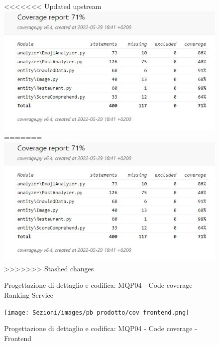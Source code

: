 \begin{figure}[H]
\centering
<<<<<<< Updated upstream
    \includegraphics[scale=0.50]{Sezioni/images/pb_prodotto/coverage-RS.JPG}
=======
    \includegraphics[scale=0.70]{Sezioni/images/pb prodotto/coverage-RS.JPG}
>>>>>>> Stashed changes
    \caption{Progettazione di dettaglio e codifica: MQP04 - Code coverage - Ranking Service}
\end{figure}
\begin{figure}[H]
    \centering
        \texttt{[image: Sezioni/images/pb prodotto/cov frontend.png]}
        \caption{Progettazione di dettaglio e codifica: MQP04 - Code coverage - Frontend}
    \end{figure}
